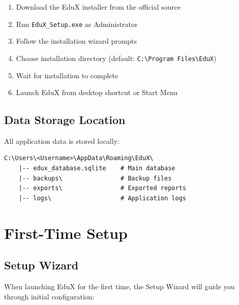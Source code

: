 \documentclass[12pt,a4paper]{report}
\begin{document}
\begin{enumerate}[leftmargin=*]
    \item Download the EduX installer from the official source
    \item Run \texttt{EduX\_Setup.exe} as Administrator
    \item Follow the installation wizard prompts
    \item Choose installation directory (default: \texttt{C:\textbackslash Program Files\textbackslash EduX})
    \item Wait for installation to complete
    \item Launch EduX from desktop shortcut or Start Menu
\end{enumerate}

\section{Data Storage Location}

All application data is stored locally:

\begin{lstlisting}
C:\Users\<Username>\AppData\Roaming\EduX\
    |-- edux_database.sqlite    # Main database
    |-- backups\                # Backup files
    |-- exports\                # Exported reports
    |-- logs\                   # Application logs
\end{lstlisting}

\chapter{First-Time Setup}

\section{Setup Wizard}

When launching EduX for the first time, the Setup Wizard will guide you through initial configuration:

\begin{center}
\end{center}
\end{document}
